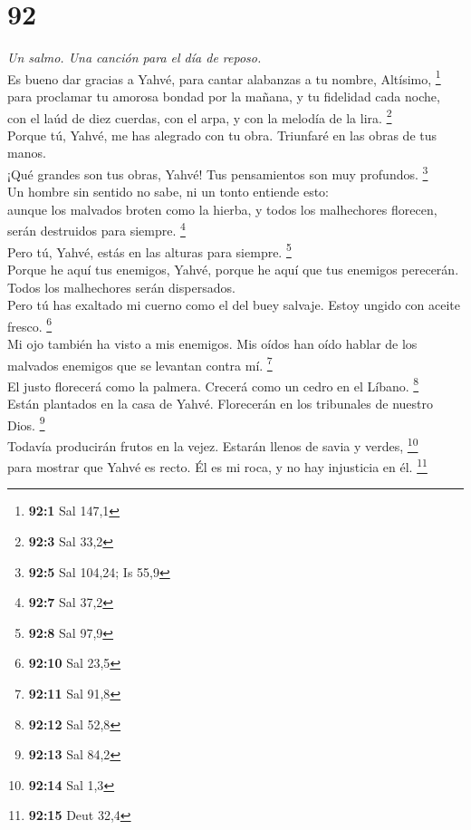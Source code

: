 \hypertarget{section-89}{%
\section{92}\label{section-89}}

\emph{Un salmo. Una canción para el día de reposo.}\\
 Es bueno dar gracias a Yahvé, para cantar alabanzas a tu
nombre, Altísimo, \footnote{\textbf{92:1} Sal 147,1}\\
 para proclamar tu amorosa bondad por la mañana, y tu
fidelidad cada noche,\\
 con el laúd de diez cuerdas, con el arpa, y con la
melodía de la lira. \footnote{\textbf{92:3} Sal 33,2}\\
 Porque tú, Yahvé, me has alegrado con tu obra. Triunfaré
en las obras de tus manos.\\
 ¡Qué grandes son tus obras, Yahvé! Tus pensamientos son
muy profundos. \footnote{\textbf{92:5} Sal 104,24; Is 55,9}\\
 Un hombre sin sentido no sabe, ni un tonto entiende
esto:\\
 aunque los malvados broten como la hierba, y todos los
malhechores florecen, serán destruidos para siempre. \footnote{\textbf{92:7}
  Sal 37,2}\\
 Pero tú, Yahvé, estás en las alturas para siempre.
\footnote{\textbf{92:8} Sal 97,9}\\
 Porque he aquí tus enemigos, Yahvé, porque he aquí que
tus enemigos perecerán. Todos los malhechores serán dispersados.\\
 Pero tú has exaltado mi cuerno como el del buey salvaje.
Estoy ungido con aceite fresco. \footnote{\textbf{92:10} Sal 23,5}\\
 Mi ojo también ha visto a mis enemigos. Mis oídos han
oído hablar de los malvados enemigos que se levantan contra mí.
\footnote{\textbf{92:11} Sal 91,8}\\
 El justo florecerá como la palmera. Crecerá como un
cedro en el Líbano. \footnote{\textbf{92:12} Sal 52,8}\\
 Están plantados en la casa de Yahvé. Florecerán en los
tribunales de nuestro Dios. \footnote{\textbf{92:13} Sal 84,2}\\
 Todavía producirán frutos en la vejez. Estarán llenos de
savia y verdes, \footnote{\textbf{92:14} Sal 1,3}\\
 para mostrar que Yahvé es recto. Él es mi roca, y no hay
injusticia en él. \footnote{\textbf{92:15} Deut 32,4}

